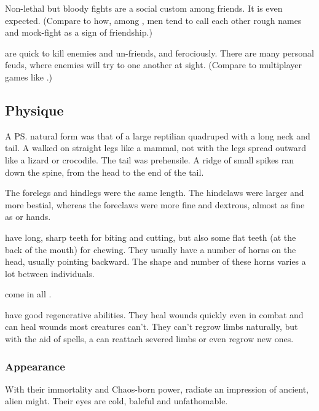 Non-lethal but bloody fights are a social custom among friends.
It is even expected. 
(Compare to how, among \humans, men tend to call each other rough names and mock-fight as a sign of friendship.)

\Dragons{} are quick to kill enemies and un-friends, and ferociously. 
There are many personal feuds, where enemies will try to  one another at sight. 
(Compare to multiplayer games like \cite{VideoGame:WorldofWarcraft}.)









\subsection{Physique}
A \ps{\dragon}{} natural form was that of a large reptilian quadruped with a long neck and tail. 
A \dragon{} walked on straight legs like a mammal, not with the legs spread outward like a lizard or crocodile. 
The tail was prehensile. 
A ridge of small spikes ran down the spine, from the head to the end of the tail. 

The forelegs and hindlegs were the same length. 
The hindclaws were larger and more bestial, whereas the foreclaws were more fine and dextrous, almost as fine as \human or \scatha hands. 

\Dragons{} have long, sharp teeth for biting and cutting, but also some flat teeth (at the back of the mouth) for chewing. 
They usually have a number of horns on the head, usually pointing backward. 
The shape and number of these horns varies a lot between individuals. 

\Dragons{} come in all \colours. 

\Dragons{} have good regenerative abilities. They heal wounds quickly even in combat and can heal wounds most creatures can't. They can't regrow limbs naturally, but with the aid of spells, a \dragon{} can reattach severed limbs or even regrow new ones. 





\subsubsection{Appearance}
With their immortality and Chaos-born power, \dragons{} radiate an impression of ancient, alien might. Their \ophidian{} eyes are cold, baleful and unfathomable. 

